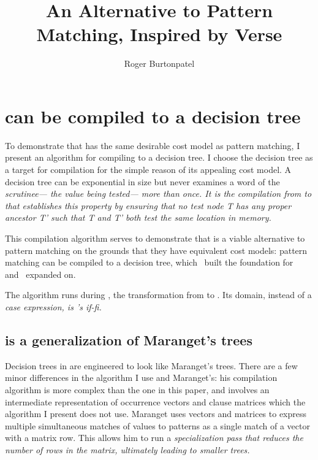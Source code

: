 \documentclass[manuscript,screen,review, 12pt, nonacm]{acmart}
\title{An Alternative to Pattern Matching, Inspired by Verse}
\author{Roger Burtonpatel}
\affiliation{%
\institution{Tufts University}
\streetaddress{419 Boston Ave}
  \city{Medford}
  \state{Massachusetts}
  \country{USA}
  \postcode{02155}
  }
\begin{document}
  

\section{\VMinus can be compiled to a decision tree}
\label{vminustod}
    To demonstrate that \VMinus has the same desirable cost model as pattern
    matching, I present an algorithm for compiling \VMinus to a decision tree. I
    choose the decision tree as a target for compilation for the simple reason
    of its appealing cost model. A decision tree can be exponential in size but
    never examines a word of the \it{scrutinee}--- the value being tested---
    more than once. It is the compilation from \VMinus to \D that establishes
    this property by ensuring that no \it{test} node \it{T} has any proper
    ancestor \it{T'} such that \it{T} and \it{T'} both test the same location in
    memory.   

    This compilation algorithm serves to demonstrate that \VMinus is a viable
    alternative to pattern matching on the grounds that they have equivalent
    cost models: pattern matching can be compiled to a decision tree,
    which~\citet{macqueen1985tree} built the foundation for and~\citet{maranget}
    expanded on. 

    The algorithm runs during \DTran, the transformation from \VMinus to \D. Its
    domain, instead of a \it{case} expression, is \VMinus's \it{if-fi}. 
       
    \subsection{\D is a generalization of Maranget's trees} 


    Decision trees in \D are engineered to look like Maranget's trees. There are
    a few minor differences in the algorithm I use and Maranget's: his
    compilation algorithm is more complex than the one in this paper, and
    involves an intermediate representation of occurrence vectors and clause
    matrices which the algorithm I present does not use. Maranget uses vectors
    and matrices to express multiple simultaneous matches of values to patterns
    as a single match of a vector with a matrix row. This allows him to run a
    \it{specialization} pass that reduces the number of rows in the matrix,
    ultimately leading to smaller trees. 
        
\end{document}
